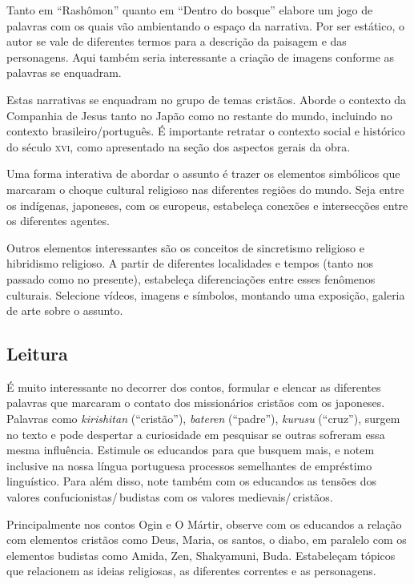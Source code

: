 \documentclass[12pt]{extarticle}
\begin{document}
Tanto em ``Rashômon'' quanto em ``Dentro do bosque'' elabore um jogo de palavras com os
quais vão ambientando o espaço da narrativa. Por ser estático, o autor se vale
de diferentes termos para a descrição da paisagem e das personagens. Aqui
também seria interessante a criação de imagens conforme as palavras se
enquadram.

Estas narrativas se enquadram no grupo de temas cristãos. Aborde o
contexto da Companhia de Jesus tanto no Japão como no restante do mundo,
incluindo no contexto brasileiro/português. É importante retratar o contexto
social e histórico do século \textsc{xvi}, como apresentado na seção dos
aspectos gerais da obra.

Uma forma interativa de abordar o assunto é trazer os elementos simbólicos que
marcaram o choque cultural religioso nas diferentes regiões do mundo. Seja
entre os indígenas, japoneses, com os europeus, estabeleça conexões e
intersecções entre os diferentes agentes.

Outros elementos interessantes são os conceitos de sincretismo religioso e
hibridismo religioso. A partir de diferentes localidades e tempos (tanto nos
passado como no presente), estabeleça diferenciações entre esses fenômenos
culturais. Selecione vídeos, imagens e símbolos, montando uma exposição,
galeria de arte sobre o assunto.

\subsection{Leitura}

É muito interessante no decorrer dos contos, formular e elencar as diferentes
palavras que marcaram o contato dos missionários cristãos com os japoneses.
Palavras como \textit{kirishitan} (``cristão''), \textit{bateren} (``padre''), 
\textit{kurusu} (``cruz''),
surgem no texto e pode despertar a curiosidade em pesquisar se outras sofreram
essa mesma influência.  Estimule os educandos para que busquem mais, e notem
inclusive na nossa língua portuguesa processos semelhantes de empréstimo
linguístico. Para além disso, note também com os educandos as tensões dos
valores confucionistas/\,budistas com os valores medievais/\,cristãos.

Principalmente nos contos Ogin e O Mártir, observe com os educandos a relação
com elementos cristãos como Deus, Maria, os santos, o diabo, em paralelo com os
elementos budistas como Amida, Zen, Shakyamuni, Buda.  Estabeleçam tópicos que
relacionem as ideias religiosas, as diferentes correntes e as personagens.
\end{document}
